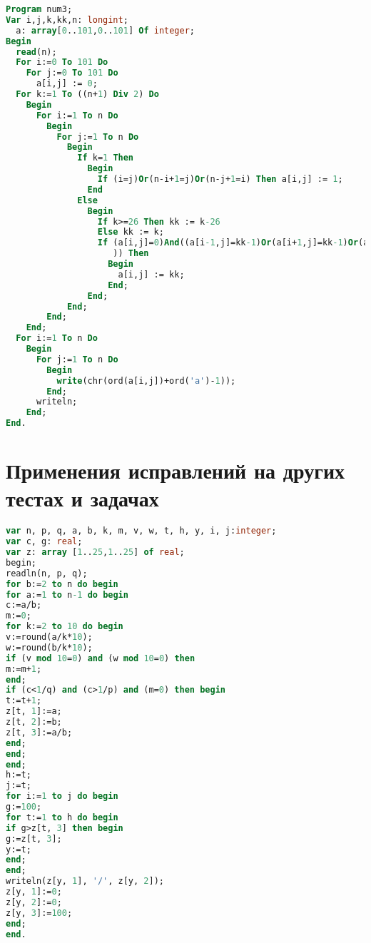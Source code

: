 \begin{algorithm}[!h] 
\caption{Исправление нового решения, приводящее к сдаче задачи}\label{lstA4:apx} 
\begin{lstlisting}[basicstyle=\small, language=pascal]
Program num3;
Var i,j,k,kk,n: longint;
  a: array[0..101,0..101] Of integer;
Begin
  read(n);
  For i:=0 To 101 Do
    For j:=0 To 101 Do
      a[i,j] := 0;
  For k:=1 To ((n+1) Div 2) Do
    Begin
      For i:=1 To n Do
        Begin
          For j:=1 To n Do
            Begin
              If k=1 Then
                Begin
                  If (i=j)Or(n-i+1=j)Or(n-j+1=i) Then a[i,j] := 1;
                End
              Else
                Begin
                  If k>=26 Then kk := k-26
                  Else kk := k;
                  If (a[i,j]=0)And((a[i-1,j]=kk-1)Or(a[i+1,j]=kk-1)Or(a[i,j-1]=kk-1)Or(a[i,j+1]=kk-1
                     )) Then
                    Begin
                      a[i,j] := kk;
                    End;
                End;
            End;
        End;
    End;
  For i:=1 To n Do
    Begin
      For j:=1 To n Do
        Begin
          write(chr(ord(a[i,j])+ord('a')-1));
        End;
      writeln;
    End;
End.
\end{lstlisting} 
\end{algorithm}

\chapter{Применения исправлений на других тестах и задачах}\label{pril2}
\begin{algorithm}[!h] 
\caption{Первоначальное решение задачи \textbf{B} с вердиктом <<Неправильный ответ $8$>>}\label{lstB1:apx} 
\begin{lstlisting}[basicstyle=\small, language=pascal]
var n, p, q, a, b, k, m, v, w, t, h, y, i, j:integer;
var c, g: real;
var z: array [1..25,1..25] of real;
begin;
readln(n, p, q);
for b:=2 to n do begin
for a:=1 to n-1 do begin
c:=a/b;
m:=0;
for k:=2 to 10 do begin
v:=round(a/k*10);
w:=round(b/k*10);
if (v mod 10=0) and (w mod 10=0) then
m:=m+1;
end;
if (c<1/q) and (c>1/p) and (m=0) then begin
t:=t+1;
z[t, 1]:=a;
z[t, 2]:=b;
z[t, 3]:=a/b;
end;
end;
end;
h:=t;
j:=t;
for i:=1 to j do begin
g:=100;
for t:=1 to h do begin
if g>z[t, 3] then begin
g:=z[t, 3];
y:=t;
end;
end;
writeln(z[y, 1], '/', z[y, 2]);
z[y, 1]:=0;
z[y, 2]:=0;
z[y, 3]:=100;
end;
end.
\end{lstlisting} 
\end{algorithm}

